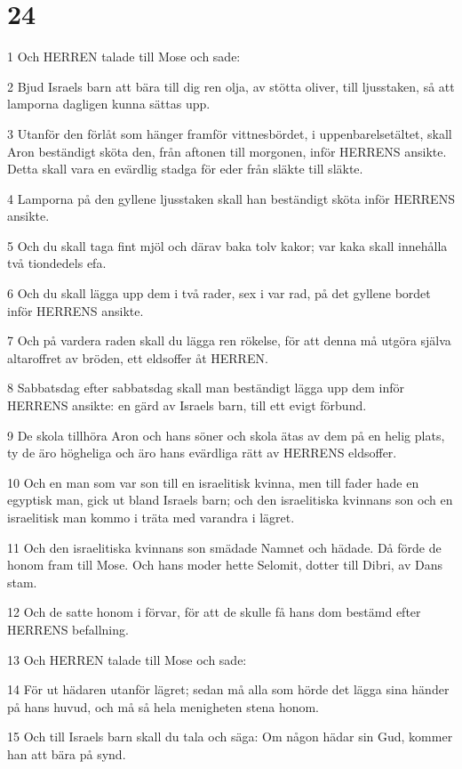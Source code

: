 \chapter{24}

\par 1 Och HERREN talade till Mose och sade:
\par 2 Bjud Israels barn att bära till dig ren olja, av stötta oliver, till ljusstaken, så att lamporna dagligen kunna sättas upp.
\par 3 Utanför den förlåt som hänger framför vittnesbördet, i uppenbarelsetältet, skall Aron beständigt sköta den, från aftonen till morgonen, inför HERRENS ansikte. Detta skall vara en evärdlig stadga för eder från släkte till släkte.
\par 4 Lamporna på den gyllene ljusstaken skall han beständigt sköta inför HERRENS ansikte.
\par 5 Och du skall taga fint mjöl och därav baka tolv kakor; var kaka skall innehålla två tiondedels efa.
\par 6 Och du skall lägga upp dem i två rader, sex i var rad, på det gyllene bordet inför HERRENS ansikte.
\par 7 Och på vardera raden skall du lägga ren rökelse, för att denna må utgöra själva altaroffret av bröden, ett eldsoffer åt HERREN.
\par 8 Sabbatsdag efter sabbatsdag skall man beständigt lägga upp dem inför HERRENS ansikte: en gärd av Israels barn, till ett evigt förbund.
\par 9 De skola tillhöra Aron och hans söner och skola ätas av dem på en helig plats, ty de äro högheliga och äro hans evärdliga rätt av HERRENS eldsoffer.
\par 10 Och en man som var son till en israelitisk kvinna, men till fader hade en egyptisk man, gick ut bland Israels barn; och den israelitiska kvinnans son och en israelitisk man kommo i träta med varandra i lägret.
\par 11 Och den israelitiska kvinnans son smädade Namnet och hädade. Då förde de honom fram till Mose. Och hans moder hette Selomit, dotter till Dibri, av Dans stam.
\par 12 Och de satte honom i förvar, för att de skulle få hans dom bestämd efter HERRENS befallning.
\par 13 Och HERREN talade till Mose och sade:
\par 14 För ut hädaren utanför lägret; sedan må alla som hörde det lägga sina händer på hans huvud, och må så hela menigheten stena honom.
\par 15 Och till Israels barn skall du tala och säga: Om någon hädar sin Gud, kommer han att bära på synd.
